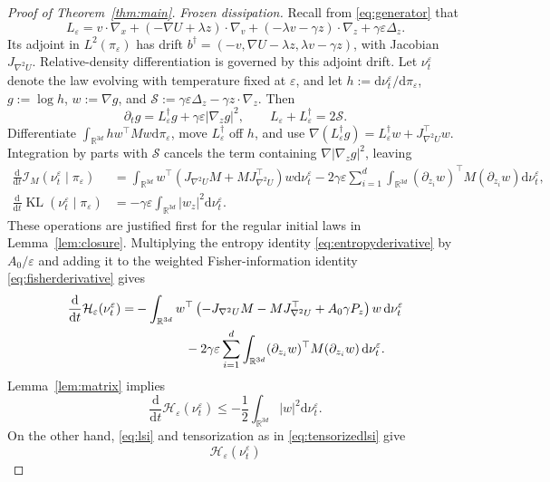 \documentclass[11pt]{article}
\theoremstyle{definition}
\newcommand{\R}{\mathbb R}
\newcommand{\dd}{\mathrm d}
\newcommand{\KL}{\operatorname{KL}}
\newcommand{\cH}{\mathcal H}
\newcommand{\cI}{\mathcal I}
\newcommand{\eps}{\varepsilon}
\begin{document}
\begin{proof}[Proof of Theorem~\ref{thm:main}]
\emph{Frozen dissipation.}
Recall from \eqref{eq:generator} that
\[
 L_\eps=v\cdot\nabla_x+(-\nabla U+\lambda z)\cdot\nabla_v
 +(-\lambda v-\gamma z)\cdot\nabla_z+\gamma\eps\Delta_z.
\]
Its adjoint in $L^2(\pi_\eps)$
has drift
$b^\dagger=(-v,\nabla U-\lambda z,\lambda v-\gamma z)$, with Jacobian
$J_{\nabla^2U}$. Relative-density differentiation is governed by this adjoint
drift. Let $\nu_t^\eps$ denote the
law evolving with temperature fixed at $\eps$, and let
$h:=\dd\nu_t^\eps/\dd\pi_\eps$, $g:=\log h$, $w:=\nabla g$, and
$\mathcal S:=\gamma\eps\Delta_z-\gamma z\cdot\nabla_z$. Then
\[
 \partial_t g=L_\eps^\dagger g+\gamma\eps|\nabla_z g|^2,
 \qquad L_\eps+L_\eps^\dagger=2\mathcal S.
\]
Differentiate $\int_{\R^{3d}} h w^\top M w\dd\pi_\eps$, move $L_\eps^\dagger$
off $h$, and use
$\nabla(L_\eps^\dagger g)=L_\eps^\dagger w+J_{\nabla^2U}^\top w$.
Integration by parts with $\mathcal S$ cancels the term containing
$\nabla|\nabla_z g|^2$, leaving
\begin{subequations}\label{eq:fisherentropyderivatives}
\begin{align}
 \frac{\dd}{\dd t}\cI_M(\nu_t^\eps\mid\pi_\eps)
 &=\int_{\R^{3d}} w^\top\left(J_{\nabla^2U}M+MJ_{\nabla^2U}^\top\right)w\dd\nu_t^\eps
   -2\gamma\eps\sum_{i=1}^{d}\int_{\R^{3d}}(\partial_{z_i}w)^\top M(\partial_{z_i}w)\dd\nu_t^\eps,
   \label{eq:fisherderivative}\\
 \frac{\dd}{\dd t}\KL(\nu_t^\eps\mid\pi_\eps)
 &=-\gamma\eps\int_{\R^{3d}}|w_z|^2\dd\nu_t^\eps.
   \label{eq:entropyderivative}
\end{align}
\end{subequations}
These operations are justified first for the regular initial laws in
Lemma~\ref{lem:closure}. Multiplying the entropy identity
\eqref{eq:entropyderivative}
by $A_0/\eps$ and adding it to the weighted Fisher-information identity
\eqref{eq:fisherderivative}
gives
\begin{align}\label{eq:frozenidentity}
 \frac{\dd}{\dd t}\cH_\eps(\nu_t^\eps)
 =&-\int_{\R^{3d}} w^\top\left(-J_{\nabla^2U}M-MJ_{\nabla^2U}^\top
                         +A_0\gamma P_z\right)w\,\dd\nu_t^\eps\notag\\
 &\qquad\qquad-2\gamma\eps\sum_{i=1}^d\int_{\R^{3d}}
           (\partial_{z_i}w)^\top M(\partial_{z_i}w)\,\dd\nu_t^\eps.
\end{align}
Lemma~\ref{lem:matrix} implies
\[
 \frac{\dd}{\dd t}\cH_\eps(\nu_t^\eps)
 \leq-\frac12\int_{\R^{3d}}|w|^2\dd\nu_t^\eps.
\]
On the other hand, \eqref{eq:lsi} and tensorization as in
\eqref{eq:tensorizedlsi} give
\[
 \cH_\eps(\nu_t^\eps)
\]
\end{proof}
\end{document}
